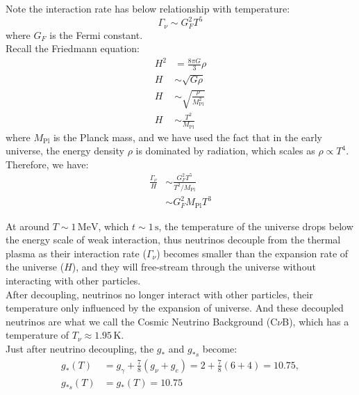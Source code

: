 \bigskip\noindent
\begin{theory}
    Note the interaction rate has below relationship with temperature:
    \[
        \Gamma_\nu \sim G_F^2 T^5
    \]
    where $G_F$ is the Fermi constant. \\

    Recall the Friedmann equation:
    \begin{align*}
        H^2 &= \frac{8\pi G}{3} \rho \\
        H &\sim \sqrt{G \rho} \\
        H &\sim \sqrt{\frac{\rho}{M_\text{Pl}^2}} \\
        H &\sim \frac{T^2}{M_\text{Pl}}
    \end{align*}
    where $M_\text{Pl}$ is the Planck mass, and we have used the fact that in the early universe, the energy density $\rho$ is dominated by radiation, which scales as $\rho \propto T^4$. \\

    Therefore, we have:
    \begin{align*}
        \frac{\Gamma_\nu}{H} &\sim \frac{G_F^2 T^5}{T^2 / M_\text{Pl}} \\
        &\sim G_F^2 M_\text{Pl} T^3
    \end{align*}
\end{theory}

At around $T \sim 1\,\mathrm{MeV}$, which $t \sim 1\,\mathrm{s}$, the temperature of the universe drops below the energy scale of weak interaction, thus neutrinos decouple from the thermal plasma as their interaction rate ($\Gamma_\nu$) becomes smaller than the expansion rate of the universe ($H$), and they will free-stream through the universe without interacting with other particles. \\

After decoupling, neutrinos no longer interact with other particles, their temperature only influenced by the expansion of universe. And these decoupled neutrinos are what we call the Cosmic Neutrino Background (C$\nu$B), which has a temperature of $T_\nu \approx 1.95\,\mathrm{K}$. \\

Just after neutrino decoupling, the $g_*$ and $g_{*s}$ become:
\begin{align*}
    g_*(T) &= g_\gamma + \frac{7}{8} (g_\nu + g_e) = 2 + \frac{7}{8} (6 + 4) = 10.75, \\
    g_{*s}(T) &= g_*(T) = 10.75
\end{align*}

